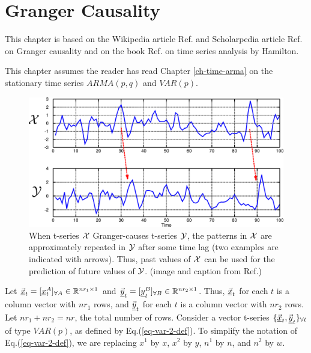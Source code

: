 \chapter{Granger Causality}
\label{ch-granger-c}

This chapter is based 
on the Wikipedia article 
Ref.\cite{wiki-granger-c}
and Scholarpedia article Ref.\cite{scho-granger-c}
on Granger causality and on
the book  Ref.\cite{hamilton2020time}
on time series analysis by Hamilton.

This chapter assumes the
reader has read Chapter \ref{ch-time-arma}
on the stationary time series $ARMA(p,q)$
and $VAR(p)$.

\begin{figure}[h!]
\centering
\includegraphics[width=5in]
{granger-c/g-causes.png}
\caption{When t-series ${\cal X}$ Granger-causes
 t-series ${\cal Y}$, the patterns in 
${\cal X}$ are approximately repeated in ${\cal Y}$ 
after some time lag (two examples 
are indicated with arrows). Thus, 
past values of ${\cal X}$ can be used for 
the prediction of future values of ${\cal Y}$.
(image and caption from Ref.\cite{wiki-granger-c})} 
\label{fig-g-causes}
\end{figure}

Let $\vec{{\underline{x}}}_t=[{\underline{x}}_t^{A}]_{\forall A}\in 
{ \mathbb{R}}^{nr_1\times 1}$
and
$\vec{{\underline{y}}}_t=[{\underline{y}}_t^{B}]_{\forall B}\in 
{ \mathbb{R}}^{nr_2\times 1}$.
Thus,
 $\vec{{\underline{x}}}_t$
for each $t$ is a
column vector with $nr_1$ rows,
and
$\vec{{\underline{y}}}_t$
for each $t$ is a
column vector with $nr_2$ rows.
Let $nr_1+nr_2=nr$, the total
number of rows.
Consider a vector 
t-series ${\{\vec{{\underline{x}}}_t, \vec{{\underline{y}}}_t\}_{\forall t}}$
of type $VAR(p)$,
as defined by Eq.(\ref{eq-var-2-def}).
To simplify
the notation
of Eq.(\ref{eq-var-2-def}), we are replacing $x^1$ by $x$,
$x^2$ by $y$,
$n^1$ by $n$,
and $n^2$ by $w$.



